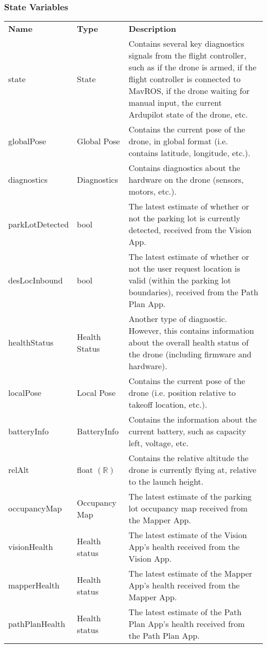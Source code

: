 \documentclass[12pt, titlepage]{article}
\begin{document}
\subsubsection{State Variables}
\begin{center}
\begin{tabular}{p{2.5 cm} p{2.5cm} p{8cm} }
\hline
\textbf{Name} & \textbf{Type} & \textbf{Description}  \\
state &  State  & Contains several key diagnostics signals from the flight controller, such as if the drone is armed, if the flight controller is connected to MavROS, if the drone waiting for manual input, the current Ardupilot state of the drone, etc.  \\
globalPose &  Global Pose  & Contains the current pose of the drone, in global format (i.e. contains latitude, longitude, etc.).  \\
diagnostics & Diagnostics  & Contains diagnostics about the hardware on the drone (sensors, motors, etc.).  \\
parkLotDetected& bool &  The latest estimate of whether or not the parking lot is currently detected, received from the Vision App.   \\
desLocInbound & bool & The latest estimate of whether or not the user request location is valid (within the parking lot boundaries), received from the Path Plan App.  \\
healthStatus & Health Status & Another type of diagnostic. However, this contains information about the overall health status of the drone (including firmware and hardware).   \\
localPose & Local Pose & Contains the current pose of the drone (i.e. position relative to takeoff location, etc.).   \\
batteryInfo & BatteryInfo & Contains the information about the current battery, such as capacity left, voltage, etc.   \\
relAlt & float $(\mathbb{R})$ & Contains the relative altitude the drone is currently flying at, relative to the launch height.  \\
occupancyMap & Occupancy Map & The latest estimate of the parking lot occupancy map received from the Mapper App.   \\
visionHealth & Health status & The latest estimate of the Vision App's health received from the Vision App.   \\
mapperHealth & Health status & The latest estimate of the Mapper App's health received from the Mapper App.   \\
pathPlanHealth & Health status & The latest estimate of the Path Plan App's health received from the Path Plan App.   \\
\hline
\hline
\end{tabular}
\end{center}
\end{document}
